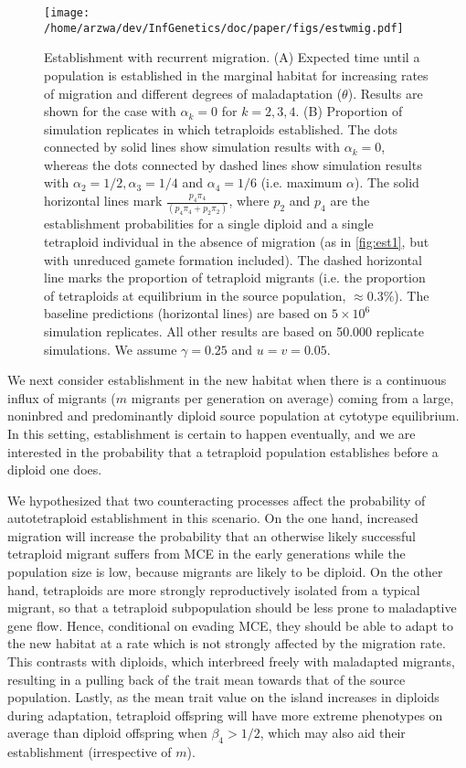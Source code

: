 \documentclass[12pt,a4paper]{article}
\begin{document}
\begin{figure}[t]
\centering
\texttt{[image: /home/arzwa/dev/InfGenetics/doc/paper/figs/estwmig.pdf]}
\caption{
    Establishment with recurrent migration.
    (A) Expected time until a population is established in the marginal habitat
    for increasing rates of migration and different degrees of maladaptation
    ($\theta$). Results are shown for the case with $\alpha_k = 0$ for
    $k=2,3,4$. 
    (B) Proportion of simulation replicates in which tetraploids established.
    The dots connected by solid lines show simulation results with
    $\alpha_k=0$, whereas the dots connected by dashed lines
    show simulation results with $\alpha_2=1/2, \alpha_3=1/4$ and
    $\alpha_4=1/6$ (i.e. maximum $\alpha$).
    The solid horizontal lines mark $\frac{p_4\pi_4}{(p_4\pi_4 + p_2\pi_2)}$,
    where $p_2$ and $p_4$ are the establishment probabilities for a single
    diploid and a single tetraploid individual in the absence of migration (as
    in \cref{fig:est1}, but with unreduced gamete formation included). 
    The dashed horizontal line marks the proportion of tetraploid migrants
    (i.e. the proportion of tetraploids at equilibrium in the source
    population, $\approx 0.3$\%).
    The baseline predictions (horizontal lines) are based on $5\times 10^6$
    simulation replicates.
    All other results are based on 50.000 replicate simulations.
    We assume $\gamma=0.25$ and $u=v=0.05$.
    \label{fig:estwmig}}
\end{figure}

We next consider establishment in the new habitat when there is a continuous
influx of migrants ($m$ migrants per generation on average) coming from a large,
noninbred and predominantly diploid source population at cytotype equilibrium.
In this setting, establishment is certain to happen eventually, and we are
interested in the probability that a tetraploid population establishes before a
diploid one does.

We hypothesized that two counteracting processes affect the probability of
autotetraploid establishment in this scenario.
On the one hand, increased migration will increase the probability that an
otherwise likely successful tetraploid migrant suffers from MCE in the early
generations while the population size is low, because migrants are likely to be
diploid.
On the other hand, tetraploids are more strongly reproductively isolated from
a typical migrant, so that a tetraploid subpopulation should be less prone to
maladaptive gene flow.
Hence, conditional on evading MCE, they should be able to adapt to the new
habitat at a rate which is not strongly affected by the migration rate.
This contrasts with diploids, which interbreed freely with maladapted
migrants, resulting in a pulling back of the trait mean towards that of the
source population.
Lastly, as the mean trait value on the island increases in diploids
during adaptation, tetraploid offspring will have more extreme phenotypes on
average than diploid offspring when $\beta_4 > 1/2$, which may also aid their
establishment (irrespective of $m$).
\end{document}
